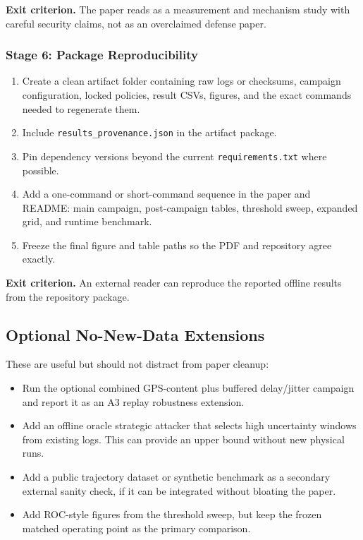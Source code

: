 \textbf{Exit criterion.} The paper reads as a measurement and mechanism study
with careful security claims, not as an overclaimed defense paper.

\subsubsection{Stage 6: Package Reproducibility}

\begin{enumerate}
    \item Create a clean artifact folder containing raw logs or checksums,
    campaign configuration, locked policies, result CSVs, figures, and the
    exact commands needed to regenerate them.

    \item Include \texttt{results\_provenance.json} in the artifact package.

    \item Pin dependency versions beyond the current \texttt{requirements.txt}
    where possible.

    \item Add a one-command or short-command sequence in the paper and README:
    main campaign, post-campaign tables, threshold sweep, expanded grid, and
    runtime benchmark.

    \item Freeze the final figure and table paths so the PDF and repository
    agree exactly.
\end{enumerate}

\textbf{Exit criterion.} An external reader can reproduce the reported
offline results from the repository package.

\subsection{Optional No-New-Data Extensions}

These are useful but should not distract from paper cleanup:

\begin{itemize}
    \item Run the optional combined GPS-content plus buffered delay/jitter
    campaign and report it as an A3 replay robustness extension.

    \item Add an offline oracle strategic attacker that selects high
    uncertainty windows from existing logs. This can provide an upper bound
    without new physical runs.

    \item Add a public trajectory dataset or synthetic benchmark as a
    secondary external sanity check, if it can be integrated without bloating
    the paper.

    \item Add ROC-style figures from the threshold sweep, but keep the frozen
    matched operating point as the primary comparison.
\end{itemize}

